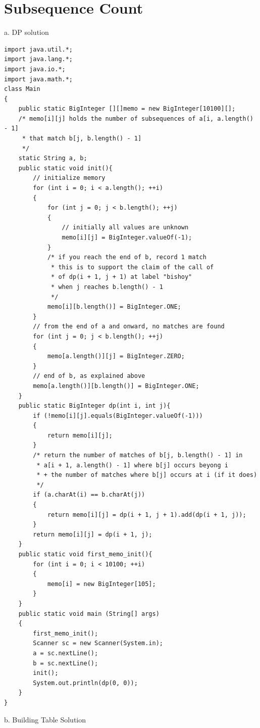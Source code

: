 \documentclass[12pt]{book}
\begin{document}
\section{Subsequence Count}
a. DP solution
\begin{verbatim}
import java.util.*;
import java.lang.*;
import java.io.*;
import java.math.*;
class Main
{
	public static BigInteger [][]memo = new BigInteger[10100][];
	/* memo[i][j] holds the number of subsequences of a[i, a.length() - 1]
	 * that match b[j, b.length() - 1]
	 */
	static String a, b;
	public static void init(){
		// initialize memory
		for (int i = 0; i < a.length(); ++i)
		{
			for (int j = 0; j < b.length(); ++j)
			{
				// initially all values are unknown
				memo[i][j] = BigInteger.valueOf(-1);
			}
			/* if you reach the end of b, record 1 match
			 * this is to support the claim of the call of
			 * of dp(i + 1, j + 1) at label "bishoy"
			 * when j reaches b.length() - 1
			 */
			memo[i][b.length()] = BigInteger.ONE;
		}
		// from the end of a and onward, no matches are found
		for (int j = 0; j < b.length(); ++j)
		{
			memo[a.length()][j] = BigInteger.ZERO;
		}
		// end of b, as explained above
		memo[a.length()][b.length()] = BigInteger.ONE;
	}
	public static BigInteger dp(int i, int j){
		if (!memo[i][j].equals(BigInteger.valueOf(-1)))
		{
			return memo[i][j];
		}
		/* return the number of matches of b[j, b.length() - 1] in
		 * a[i + 1, a.length() - 1] where b[j] occurs beyong i
		 * + the number of matches where b[j] occurs at i (if it does)
		 */
		if (a.charAt(i) == b.charAt(j))
		{
			return memo[i][j] = dp(i + 1, j + 1).add(dp(i + 1, j));
		}
		return memo[i][j] = dp(i + 1, j);
	}
	public static void first_memo_init(){
		for (int i = 0; i < 10100; ++i)
		{
			memo[i] = new BigInteger[105];
		}
	}
	public static void main (String[] args)
	{
		first_memo_init();
		Scanner sc = new Scanner(System.in);
		a = sc.nextLine();
		b = sc.nextLine();
		init();
		System.out.println(dp(0, 0));
	}
}
\end{verbatim}
b. Building Table Solution
\end{document}

